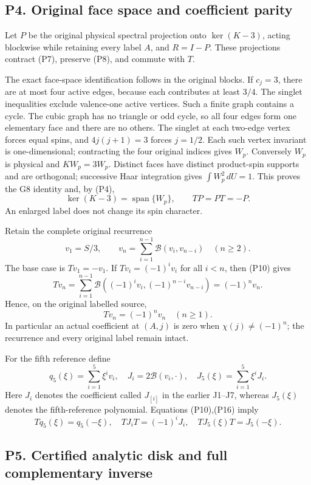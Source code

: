 \documentclass[11pt]{article}
\begin{document}
\subsection*{P4. Original face space and coefficient parity}

Let \(P\) be the original physical spectral projection onto \(\ker(K-3)\), acting blockwise while retaining every label \(A\), and \(R=I-P\). These projections contract (P7), preserve (P8), and commute with \(T\).

The exact face-space identification follows in the original blocks. If \(c_j=3\), there are at most four active edges, because each contributes at least \(3/4\). The singlet inequalities exclude valence-one active vertices. Such a finite graph contains a cycle. The cubic graph has no triangle or odd cycle, so all four edges form one elementary face and there are no others. The singlet at each two-edge vertex forces equal spins, and \(4j(j+1)=3\) forces \(j=1/2\). Each such vertex invariant is one-dimensional; contracting the four original indices gives \(W_p\). Conversely \(W_p\) is physical and \(KW_p=3W_p\). Distinct faces have distinct product-spin supports and are orthogonal; successive Haar integration gives \(\int W_p^2\,dU=1\). This proves the G8 identity and, by (P4),
\[
 \ker(K-3)=\operatorname{span}\{W_p\},\qquad TP=PT=-P. \tag{P14}
\]
An enlarged label does not change its spin character.

Retain the complete original recurrence
\[
 v_1=S/3,\qquad v_n=\sum_{i=1}^{n-1}\mathcal B(v_i,v_{n-i})\quad(n\ge2).
 \tag{P15}
\]
The base case is \(Tv_1=-v_1\). If \(Tv_i=(-1)^iv_i\) for all \(i<n\), then (P10) gives
\[
 Tv_n=\sum_{i=1}^{n-1}\mathcal B((-1)^iv_i,(-1)^{n-i}v_{n-i})
 =(-1)^nv_n.
\]
Hence, on the original labelled source,
\[
 \boxed{Tv_n=(-1)^nv_n\quad(n\ge1).} \tag{P16}
\]
In particular an actual coefficient at \((A,j)\) is zero when \(\chi(j)\ne(-1)^n\); the recurrence and every original label remain intact.

For the fifth reference define
\[
 q_5(\xi)=\sum_{i=1}^5\xi^iv_i,\quad
 J_i=2\mathcal B(v_i,\cdot),\quad
 J_5(\xi)=\sum_{i=1}^5\xi^iJ_i.
\]
Here \(J_i\) denotes the coefficient called \(J_{[i]}\) in the earlier J1–J7, whereas \(J_5(\xi)\) denotes the fifth-reference polynomial. Equations (P10),(P16) imply
\[
 Tq_5(\xi)=q_5(-\xi),\quad TJ_iT=(-1)^iJ_i,\quad
 TJ_5(\xi)T=J_5(-\xi). \tag{P17}
\]

\subsection*{P5. Certified analytic disk and full complementary inverse}
\end{document}
